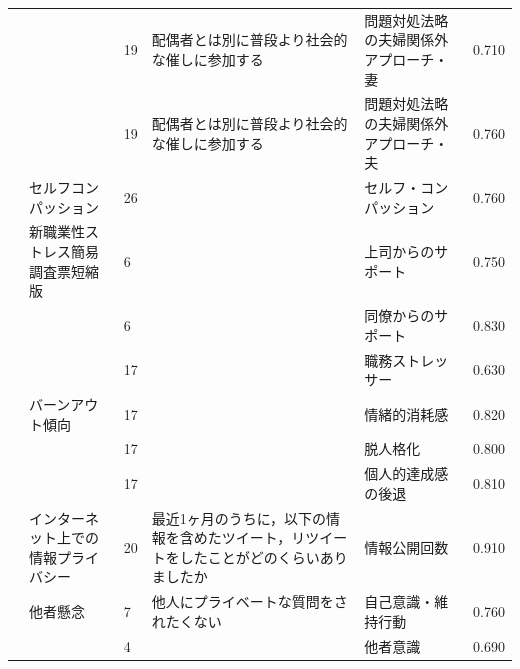 \begin{landscape}
\begin{longtable}{p{2cm}p{2cm}p{2cm}p{6cm}p{2cm}p{2cm}}
                                 &                                  & 19  & 配偶者とは別に普段より社会的な催しに参加する                              & 問題対処法略の夫婦関係外アプローチ・妻  & 0.710   \\
                                 &                                  & 19  & 配偶者とは別に普段より社会的な催しに参加する                              & 問題対処法略の夫婦関係外アプローチ・夫  & 0.760   \\
        \citet{Mizuno202192}     & セルフコンパッション                       & 26  &                                                     & セルフ・コンパッション          & 0.760   \\
                                 & 新職業性ストレス簡易調査票短縮版                 & 6   &                                                     & 上司からのサポート            & 0.750   \\
                                 &                                  & 6   &                                                     & 同僚からのサポート            & 0.830   \\
                                 &                                  & 17  &                                                     & 職務ストレッサー             & 0.630   \\
                                 & バーンアウト傾向                         & 17  &                                                     & 情緒的消耗感               & 0.820   \\
                                 &                                  & 17  &                                                     & 脱人格化                 & 0.800   \\
                                 &                                  & 17  &                                                     & 個人的達成感の後退            & 0.810   \\
        \citet{Tabata202192}     & インターネット上での情報プライバシー               & 20  & 最近1ヶ月のうちに，以下の情報を含めたツイート，リツイートをしたことがどのくらいありましたか      & 情報公開回数               & 0.910   \\
                                 & 他者懸念                             & 7   & 他人にプライベートな質問をされたくない                                 & 自己意識・維持行動            & 0.760   \\
                                 &                                  & 4   &                                                     & 他者意識                 & 0.690   \\

\end{longtable}
\end{landscape}
